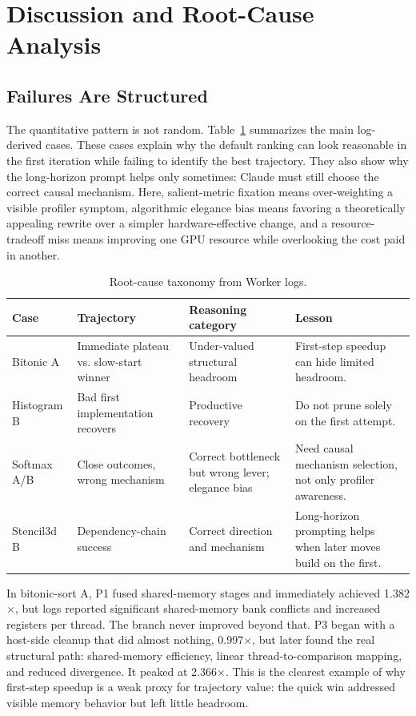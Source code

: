 \documentclass[conference]{IEEEtran}
\begin{document}
\section{Discussion and Root-Cause Analysis}

\subsection{Failures Are Structured}

The quantitative pattern is not random. Table~\ref{tab:taxonomy} summarizes
the main log-derived cases. These cases explain why the default ranking can
look reasonable in the first iteration while failing to identify the best
trajectory. They also show why the long-horizon prompt helps only sometimes:
Claude must still choose the correct causal mechanism.
Here, salient-metric fixation means over-weighting a visible profiler symptom,
algorithmic elegance bias means favoring a theoretically appealing rewrite over
a simpler hardware-effective change, and a resource-tradeoff miss means
improving one GPU resource while overlooking the cost paid in another.

\begin{table}[t]
\centering
\caption{Root-cause taxonomy from Worker logs.}
\label{tab:taxonomy}
\scriptsize
\begin{tabular}{p{}p{}p{}p{}}
\toprule
\textbf{Case} & \textbf{Trajectory} & \textbf{Reasoning category} &
\textbf{Lesson} \\
\midrule
Bitonic A & Immediate plateau vs. slow-start winner &
Under-valued structural headroom &
First-step speedup can hide limited headroom. \\
Histogram B & Bad first implementation recovers &
Productive recovery &
Do not prune solely on the first attempt. \\
Softmax A/B & Close outcomes, wrong mechanism &
Correct bottleneck but wrong lever; elegance bias &
Need causal mechanism selection, not only profiler awareness. \\
Stencil3d B & Dependency-chain success &
Correct direction and mechanism &
Long-horizon prompting helps when later moves build on the first. \\
\bottomrule
\end{tabular}
\end{table}

In bitonic-sort A, P1 fused shared-memory stages and immediately achieved
1.382$\times$, but logs reported significant shared-memory bank conflicts and
increased registers per thread. The branch never improved beyond that. P3
began with a host-side cleanup that did almost nothing, 0.997$\times$, but
later found the real structural path: shared-memory efficiency, linear
thread-to-comparison mapping, and reduced divergence. It peaked at
2.366$\times$. This is the clearest example of why first-step speedup is a
weak proxy for trajectory value: the quick win addressed visible memory
behavior but left little headroom.
\end{document}
